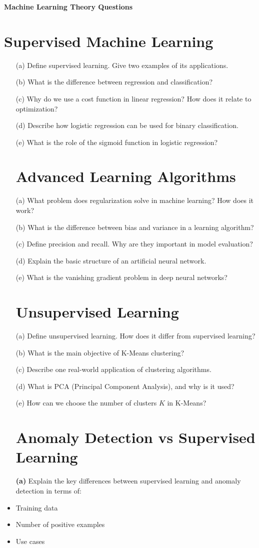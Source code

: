 \documentclass{article}
\begin{document}
\textbf{{Machine Learning Theory Questions}}
\section*{Supervised Machine Learning}
\begin{itemize}
    \item[(a)] Define supervised learning. Give two examples of its applications.
    \item[(b)] What is the difference between regression and classification?
    \item[(c)] Why do we use a cost function in linear regression? How does it relate to optimization?
    \item[(d)] Describe how logistic regression can be used for binary classification.
    \item[(e)] What is the role of the sigmoid function in logistic regression?
\section*{Advanced Learning Algorithms}
    \item[(a)] What problem does regularization solve in machine learning? How does it work?
    \item[(b)] What is the difference between bias and variance in a learning algorithm?
    \item[(c)] Define precision and recall. Why are they important in model evaluation?
    \item[(d)] Explain the basic structure of an artificial neural network.
    \item[(e)] What is the vanishing gradient problem in deep neural networks?
\section*{Unsupervised Learning}

    \item[(a)] Define unsupervised learning. How does it differ from supervised learning?
    \item[(b)] What is the main objective of K-Means clustering?
    \item[(c)] Describe one real-world application of clustering algorithms.
    \item[(d)] What is PCA (Principal Component Analysis), and why is it used?
    \item[(e)] How can we choose the number of clusters \( K \) in K-Means?
\section*{Anomaly Detection vs Supervised Learning}
\textbf{(a)} Explain the key differences between supervised learning and anomaly detection in terms of:
    \item Training data
    \item Number of positive examples
    \item Use cases
\end{itemize}
\vspace{0.5cm}
\end{document}
